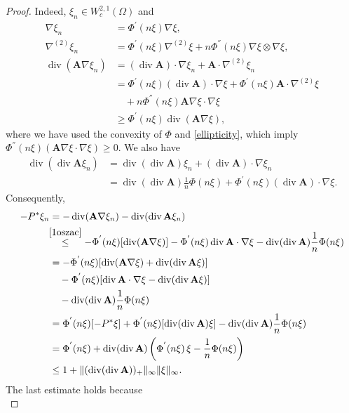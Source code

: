 \documentclass[10pt,a4paper]{amsart}
\newcommand{\A}{\mathbf{A}}
\newcommand*\Div{\operatorname{div}}
\begin{document}
\begin{proof}
    Indeed, $\xi_n\in W^{2,1}_c(\Omega)$ and
    \begin{align}
        \nabla \xi_n   &=\Phi^{'}(n\xi )\nabla\xi  ,\nonumber\\
        \nabla^{(2)}\xi_n  &= \Phi^{'}(n\xi )\nabla^{(2)}\xi  + n\Phi^{''}(n\xi )\nabla\xi  \otimes \nabla\xi  ,\nonumber\\
        \Div(\A\nabla\xi_n) &= (\Div\A)\cdot \nabla\xi_n + \A\cdot \nabla^{(2)}\xi_n\label{1oszac}\\
        &= \Phi^{'}(n\xi )(\Div\A)\cdot \nabla\xi   + \Phi^{'}(n\xi ) \A\cdot\nabla^{(2)}\xi  \nonumber\\ 
        & \quad + n\Phi^{''}(n\xi ) \A \nabla\xi  \cdot \nabla\xi  \nonumber\\
        &\ge  \Phi^{'}(n\xi )\Div(\A \nabla\xi ) ,\nonumber
    \end{align}
    where we have used the convexity of $\Phi$ and \eqref{ellipticity}, which imply $\Phi^{''}(n\xi )(\A \nabla\xi \cdot\nabla \xi)\ge 0$.
    We also have
    \begin{align}\label{eq:divdivterm}
    \Div(\Div\A\xi_n) &= \Div(\Div\A)\xi_n + (\Div\A)\cdot\nabla \xi_n\\
    &= \Div(\Div\A)\frac{1}{n}\Phi(n\xi ) + 
     \Phi^{'}(n\xi )(\Div\A)\cdot \nabla\xi  \nonumber. 
    \end{align}
    Consequently,
    \begin{align*}
    -P^*\xi_n &= -\Div(\A\nabla\xi_n) - \Div(\Div\A\xi_n)\\
    &\! \!\stackrel{\eqref{1oszac} }{\le}  - \Phi^{'}(n\xi )[\Div(\A\nabla\xi )]  -  \Phi^{'}(n\xi ) \Div\A\cdot \nabla\xi   - \Div(\Div\A)\frac{1}{n}\Phi(n\xi )\\
    &=  -\Phi^{'}(n\xi )[ \Div(\A \nabla\xi ) + \Div(\Div\A \xi )]  \\ &\quad -  \Phi^{'}(n\xi )[\Div\A\cdot \nabla\xi  
    -\Div(\Div\A \xi )]\\
    &\quad - \Div(\Div\A)\frac{1}{n}\Phi(n\xi )\\
    &= \Phi^{'}(n\xi )[-P^*\xi] + \Phi^{'}(n\xi )
    [\Div(\Div\A ) \xi] -  \Div(\Div\A)\frac{1}{n}\Phi(n\xi )\\
    &=  \Phi^{'}(n\xi ) +   \Div(\Div\A )\left( \Phi^{'}(n\xi )\, \xi - \frac{1}{n}\Phi(n\xi )\right) \\
    &\le 1+ \| (\Div(\Div\A ))_+\|_{\infty}\|\xi\|_\infty.
    \end{align*}
    The last estimate holds because
    \begin{equation*}

\end{equation*}
\end{proof}
\end{document}
